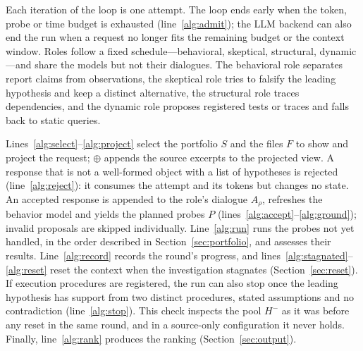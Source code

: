 \documentclass[a4paper,fleqn]{cas-sc}
\begin{document}
Each iteration of the loop is one attempt. The loop ends early when the token, probe or time budget is exhausted (line~\ref{alg:admit}); the LLM backend can also end the run when a request no longer fits the remaining budget or the context window. Roles follow a fixed schedule---behavioral, skeptical, structural, dynamic---and share the models but not their dialogues. The behavioral role separates report claims from observations, the skeptical role tries to falsify the leading hypothesis and keep a distinct alternative, the structural role traces dependencies, and the dynamic role proposes registered tests or traces and falls back to static queries.

Lines~\ref{alg:select}--\ref{alg:project} select the portfolio $S$ and the files $F$ to show and project the request; $\oplus$ appends the source excerpts to the projected view. A response that is not a well-formed object with a list of hypotheses is rejected (line~\ref{alg:reject}): it consumes the attempt and its tokens but changes no state. An accepted response is appended to the role's dialogue $A_\rho$, refreshes the behavior model and yields the planned probes $P$ (lines~\ref{alg:accept}--\ref{alg:ground}); invalid proposals are skipped individually. Line~\ref{alg:run} runs the probes not yet handled, in the order described in Section~\ref{sec:portfolio}, and assesses their results. Line~\ref{alg:record} records the round's progress, and lines~\ref{alg:stagnated}--\ref{alg:reset} reset the context when the investigation stagnates (Section~\ref{sec:reset}). If execution procedures are registered, the run can also stop once the leading hypothesis has support from two distinct procedures, stated assumptions and no contradiction (line~\ref{alg:stop}). This check inspects the pool $H^{-}$ as it was before any reset in the same round, and in a source-only configuration it never holds. Finally, line~\ref{alg:rank} produces the ranking (Section~\ref{sec:output}).
\end{document}

